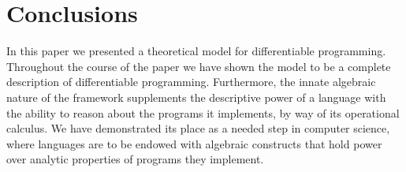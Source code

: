 \section{Conclusions}

In this paper we presented a theoretical model for differentiable programming. Throughout the course of the paper we have shown the model to be a complete description of differentiable programming.
Furthermore, the innate algebraic nature of the framework supplements the descriptive power of a language with the ability to reason about the programs it implements, by way of its operational calculus. We have demonstrated its place as a needed step in computer science, where languages are to be endowed with algebraic constructs that hold power over analytic properties of programs they implement. 
